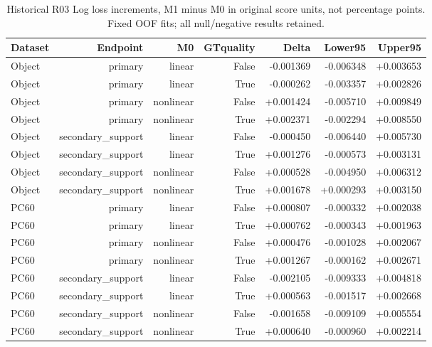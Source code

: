 \begin{table}[htbp]
\centering\scriptsize
\caption{Historical R03 Log loss increments, M1 minus M0 in original score units, not percentage points. Fixed OOF fits; all null/negative results retained.}
\label{tab:r03-log_loss}
\setlength{\tabcolsep}{4pt}
\begin{tabular}{lrrrrrr}
\toprule
Dataset & Endpoint & M0 & GTquality & Delta & Lower95 & Upper95 \\
\midrule
Object & primary & linear & False & -0.001369 & -0.006348 & +0.003653 \\
Object & primary & linear & True & -0.000262 & -0.003357 & +0.002826 \\
Object & primary & nonlinear & False & +0.001424 & -0.005710 & +0.009849 \\
Object & primary & nonlinear & True & +0.002371 & -0.002294 & +0.008550 \\
Object & secondary\_support & linear & False & -0.000450 & -0.006440 & +0.005730 \\
Object & secondary\_support & linear & True & +0.001276 & -0.000573 & +0.003131 \\
Object & secondary\_support & nonlinear & False & +0.000528 & -0.004950 & +0.006312 \\
Object & secondary\_support & nonlinear & True & +0.001678 & +0.000293 & +0.003150 \\
PC60 & primary & linear & False & +0.000807 & -0.000332 & +0.002038 \\
PC60 & primary & linear & True & +0.000762 & -0.000343 & +0.001963 \\
PC60 & primary & nonlinear & False & +0.000476 & -0.001028 & +0.002067 \\
PC60 & primary & nonlinear & True & +0.001267 & -0.000162 & +0.002671 \\
PC60 & secondary\_support & linear & False & -0.002105 & -0.009333 & +0.004818 \\
PC60 & secondary\_support & linear & True & +0.000563 & -0.001517 & +0.002668 \\
PC60 & secondary\_support & nonlinear & False & -0.001658 & -0.009109 & +0.005554 \\
PC60 & secondary\_support & nonlinear & True & +0.000640 & -0.000960 & +0.002214 \\
\bottomrule
\end{tabular}
\end{table}
